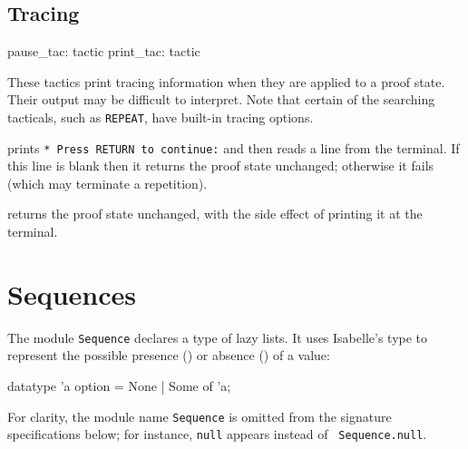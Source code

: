 \subsection{Tracing}
\begin{ttbox} 
pause_tac: tactic
print_tac: tactic
\end{ttbox}
These tactics print tracing information when they are applied to a proof
state.  Their output may be difficult to interpret.  Note that certain of
the searching tacticals, such as {\tt REPEAT}, have built-in tracing
options.
\begin{ttdescription}
\item[\ttindexbold{pause_tac}] 
prints {\footnotesize\tt** Press RETURN to continue:} and then reads a line
from the terminal.  If this line is blank then it returns the proof state
unchanged; otherwise it fails (which may terminate a repetition).

\item[\ttindexbold{print_tac}] 
returns the proof state unchanged, with the side effect of printing it at
the terminal.
\end{ttdescription}


\section{Sequences}
The module {\tt Sequence} declares a type of lazy lists.  It uses
Isabelle's type  to represent the possible presence
() or absence () of
a value:
\begin{ttbox}
datatype 'a option = None  |  Some of 'a;
\end{ttbox}
For clarity, the module name {\tt Sequence} is omitted from the signature
specifications below; for instance, {\tt null} appears instead of {\tt
  Sequence.null}.

